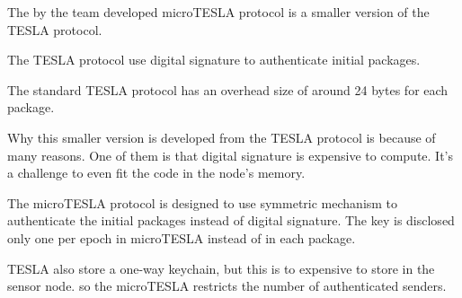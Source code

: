 \tiny
The by the team developed microTESLA protocol is a smaller version of the TESLA protocol.

The TESLA protocol use digital signature to authenticate initial packages.

The standard TESLA protocol has an overhead size of around 24 bytes for each package.

\bigskip


Why this smaller version is developed from the TESLA protocol is because of many reasons. One of them is that digital signature is expensive to compute. It's a challenge to even fit the code in the node's memory.

\bigskip


The microTESLA protocol is designed to use symmetric mechanism to authenticate the initial packages instead of digital signature. The key is disclosed only one per epoch in microTESLA instead of in each package.

\bigskip


TESLA also store a one-way keychain, but this is to expensive to store in the sensor node. so the microTESLA restricts the number of authenticated senders.